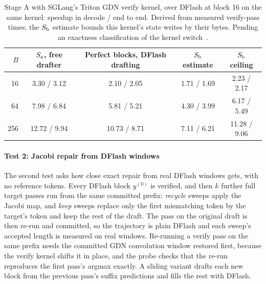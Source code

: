 \begin{table}[htbp]
\small\centering
\begin{tabular}{@{}rcccc@{}}\toprule
$B$ & $S_{\rm a}$, free drafter & Perfect blocks, DFlash drafting & $S_{\rm b}$ estimate & $S_{\rm b}$ ceiling\\\midrule
16 & 3.30 / 3.12 & 2.10 / 2.05 & 1.71 / 1.69 & 2.23 / 2.17\\
64 & 7.98 / 6.84 & 5.81 / 5.21 & 4.30 / 3.99 & 6.17 / 5.49\\
256 & 12.72 / 9.94 & 10.73 / 8.71 & 7.11 / 6.21 & 11.28 / 9.06\\\bottomrule
\end{tabular}
\caption{Stage A with SGLang's Triton GDN verify kernel, over DFlash at block 16 on the same kernel: speedup in decode / end to end. Derived from measured verify-pass times; the $S_{\rm b}$ estimate bounds this kernel's state writes by their bytes. Pending an exactness classification of the kernel switch~.}
\label{tab:stagea-triton}
\end{table}

\paragraph{Test 2: Jacobi repair from DFlash windows}\label{sec:repair-jacobi} The second test asks how close exact repair from real DFlash windows gets, with no reference tokens. Every DFlash block $y^{(0)}$ is verified, and then $k$ further full target passes run from the same committed prefix: \emph{recycle} sweeps apply the Jacobi map, and \emph{keep} sweeps replace only the first mismatching token by the target's token and keep the rest of the draft. The pass on the original draft is then re-run and committed, so the trajectory is plain DFlash and each sweep's accepted length is measured on real windows. Re-running a verify pass on the same prefix needs the committed GDN convolution window restored first, because the verify kernel shifts it in place, and the probe checks that the re-run reproduces the first pass's argmax exactly. A sliding variant drafts each new block from the previous pass's suffix predictions and fills the rest with DFlash.

